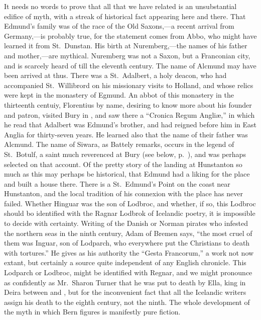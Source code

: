 \documentclass[10pt]{book}
\begin{document}
{It needs no words to prove that all that we have related is an unsubstantial edifice of myth, with a streak of historical fact appearing here and there. That Edmund's family was of the race of the Old Saxons,---a recent arrival from Germany,---is probably true, for the statement comes from Abbo, who might have learned it from St.\ Dunstan. His birth at Nuremberg,---the names of his father and mother,---are mythical. Nuremberg was not a Saxon, but a Franconian city, and is scarcely heard of till the eleventh century. The name of Alcmund may have been arrived at thus. There was a St.\ Adalbert, a holy deacon, who had accompanied St.\ Willibrord on his missionary visits to Holland, and whose relics were kept in the monastery of Egmund. An abbot of this monastery in the thirteenth centuiy, Florentius by name, desiring to know more about his founder and patron, visited Bury in , and saw there a ``Cronica Regum Angli\ae{},'' in which he read that Adalbert was Edmund's brother, and had reigned before him in East Anglia for thirty-seven years. He learned also that the name of their father was Alcmund. The name of Siwara, as Battely remarks, occurs in the legend of St.\ Botulf, a saint much reverenced at Bury (see below, p.\ ), and was perhaps selected on that account. Of the pretty story of the landing at Hunstanton so much as this may perhaps be historical, that Edmund had a liking for the place and built a house there. There is a St.\ Edmund's Point on the coast near Hunstanton, and the local tradition of his connexion with the place has never failed. Whether Hinguar was the son of Lodbroc, and whether, if so, this Lodbroc should bo identified with the Ragnar Lodbrok of Icelandic poetry, it is impossible to decide with certainty. Writing of the Danish or Norman pirates who infested the northern seas in the ninth century, Adam of Bremen says, ``the most cruel of them was Inguar, son of Lodparch, who everywhere put the Christians to death with tortures.'' He gives as his authority the ``Gesta Francorum,'' a work not now extant, but certainly a source quite independent of any English chronicle. This Lodparch or Lodbroc, might be identified with Regnar, and we might pronounce as confidently as Mr.\ Sharon Turner that he was put to death by Ella, king in Deira between  and , but for the inconvenient fact that all the Icelandic writers assign his death to the eighth century, not the ninth. The whole development of the myth in which Bern figures is manifestly pure fiction.

}
\end{document}
